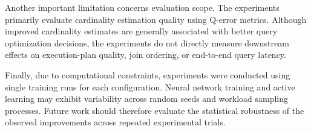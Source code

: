 Another important limitation concerns evaluation scope. The experiments primarily evaluate cardinality estimation quality using Q-error metrics. Although improved cardinality estimates are generally associated with better query optimization decisions, the experiments do not directly measure downstream effects on execution-plan quality, join ordering, or end-to-end query latency.

Finally, due to computational constraints, experiments were conducted using single training runs for each configuration. Neural network training and active learning may exhibit variability across random seeds and workload sampling processes. Future work should therefore evaluate the statistical robustness of the observed improvements across repeated experimental trials.